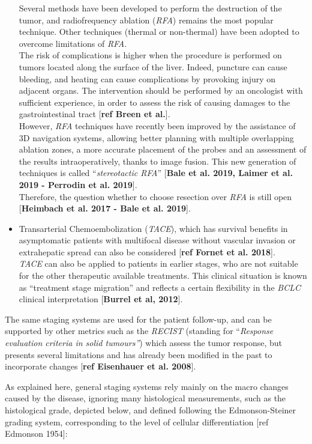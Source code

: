 \documentclass[]{article}
\begin{document}
\begin{itemize}
  Several methods have been developed to perform the destruction of the
  tumor, and radiofrequency ablation (\emph{RFA}) remains the most
  popular technique. Other techniques (thermal or non-thermal) have been
  adopted to overcome limitations of \emph{RFA}.\\
  The risk of complications is higher when the procedure is performed on
  tumors located along the surface of the liver. Indeed, puncture can
  cause bleeding, and heating can cause complications by provoking
  injury on adjacent organs. The intervention should be performed by an
  oncologist with sufficient experience, in order to assess the risk of
  causing damages to the gastrointestinal tract {[}\textbf{ref Breen et
  al.}{]}.\\
  However, \emph{RFA} techniques have recently been improved by the
  assistance of 3D navigation systems, allowing better planning with
  multiple overlapping ablation zones, a more accurate placement of the
  probes and an assessment of the results intraoperatively, thanks to
  image fusion. This new generation of techniques is called
  ``\emph{stereotactic RFA}'' {[}\textbf{Bale et al. 2019, Laimer et al.
  2019 - Perrodin et al. 2019}{]}.\\
  Therefore, the question whether to choose resection over \emph{RFA} is
  still open {[}\textbf{Heimbach et al. 2017 - Bale et al. 2019}{]}.
\item
  Transarterial Chemoembolization (\emph{TACE}), which has survival
  benefits in asymptomatic patients with multifocal disease without
  vascular invasion or extrahepatic spread can also be considered
  {[}\textbf{ref Fornet et al. 2018}{]}.\\
  \emph{TACE} can also be applied to patients in earlier stages, who are
  not suitable for the other therapeutic available treatments. This
  clinical situation is known as ``treatment stage migration'' and
  reflects a certain flexibility in the \emph{BCLC} clinical
  interpretation {[}\textbf{Burrel et al, 2012}{]}.
\end{itemize}

The same staging systems are used for the patient follow-up, and can be
supported by other metrics such as the \emph{RECIST} (standing for
``\emph{Response evaluation criteria in solid tumours''}) which assess
the tumor response, but presents several limitations and has already
been modified in the past to incorporate changes {[}\textbf{ref
Eisenhauer et al. 2008}{]}.

As explained here, general staging systems rely mainly on the macro
changes caused by the disease, ignoring many histological measurements,
such as the histological grade, depicted below, and defined following
the Edmonson-Steiner grading system, corresponding to the level of
cellular differentiation {[}ref Edmonson 1954{]}:
\end{document}
